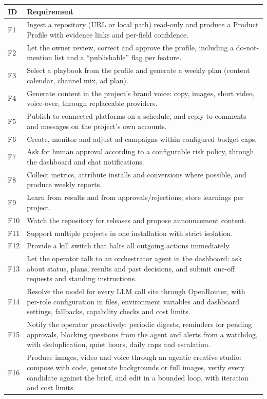 \documentclass[11pt,a4paper]{article}
\begin{document}
\begin{longtable}{@{}p{1.1cm}p{14.2cm}@{}}
\toprule
\textbf{ID} & \textbf{Requirement}\\
\midrule
\endhead
F1 & Ingest a repository (URL or local path) read-only and produce a Product Profile with evidence links and per-field confidence.\\
F2 & Let the owner review, correct and approve the profile, including a do-not-mention list and a ``publishable'' flag per feature.\\
F3 & Select a playbook from the profile and generate a weekly plan (content calendar, channel mix, ad plan).\\
F4 & Generate content in the project's brand voice: copy, images, short video, voice-over, through replaceable providers.\\
F5 & Publish to connected platforms on a schedule, and reply to comments and messages on the project's own accounts.\\
F6 & Create, monitor and adjust ad campaigns within configured budget caps.\\
F7 & Ask for human approval according to a configurable risk policy, through the dashboard and chat notifications.\\
F8 & Collect metrics, attribute installs and conversions where possible, and produce weekly reports.\\
F9 & Learn from results and from approvals/rejections; store learnings per project.\\
F10 & Watch the repository for releases and propose announcement content.\\
F11 & Support multiple projects in one installation with strict isolation.\\
F12 & Provide a kill switch that halts all outgoing actions immediately.\\
F13 & Let the operator talk to an orchestrator agent in the dashboard: ask about status, plans, results and past decisions, and submit one-off requests and standing instructions.\\
F14 & Resolve the model for every LLM call site through OpenRouter, with per-role configuration in files, environment variables and dashboard settings, fallbacks, capability checks and cost limits.\\
F15 & Notify the operator proactively: periodic digests, reminders for pending approvals, blocking questions from the agent and alerts from a watchdog, with deduplication, quiet hours, daily caps and escalation.\\
F16 & Produce images, video and voice through an agentic creative studio: compose with code, generate backgrounds or full images, verify every candidate against the brief, and edit in a bounded loop, with iteration and cost limits.\\
\bottomrule
\end{longtable}
\end{document}
